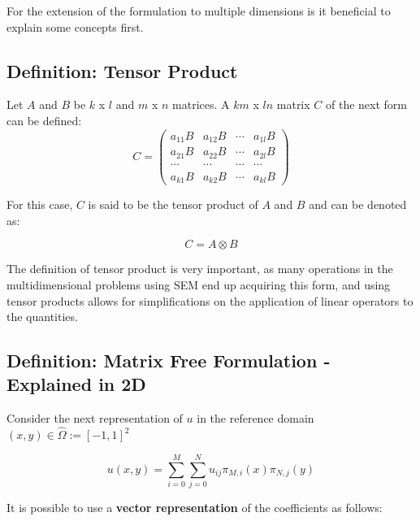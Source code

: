 \documentclass[
  a4paper,
  10pt]{article}
\begin{document}
For the extension of the formulation to multiple dimensions is it
beneficial to explain some concepts first.

\hypertarget{definition-tensor-product}{%
\subsection{Definition: Tensor
Product}\label{definition-tensor-product}}

Let \(A\) and \(B\) be \(k\) x \(l\) and \(m\) x \(n\) matrices. A
\(km\) x \(ln\) matrix \(C\) of the next form can be defined:
\begin{equation}
C=
\begin{pmatrix}
a_{11}B & a_{12}B & \cdots & a_{1l}B\\
a_{21}B & a_{22}B & \cdots & a_{2l}B\\
\cdots & \cdots & \cdots & \cdots\\
a_{k1}B & a_{k2}B & \cdots & a_{kl}B
\end{pmatrix}
\end{equation}

For this case, \(C\) is said to be the tensor product of \(A\) and \(B\)
and can be denoted as:

\begin{equation}
    C=A \otimes B
\end{equation}

The definition of tensor product is very important, as many operations
in the multidimensional problems using SEM end up acquiring this form,
and using tensor products allows for simplifications on the application
of linear operators to the quantities.

\hypertarget{definition-matrix-free-formulation---explained-in-2d}{%
\subsection{Definition: Matrix Free Formulation - Explained in
2D}\label{definition-matrix-free-formulation---explained-in-2d}}

Consider the next representation of \(u\) in the reference
domain\((x,y) \in \hat{\Omega}:=[-1,1]^{2}\)

\begin{equation}
    u(x,y)=\sum_{i=0}^{M}\sum_{j=0}^{N} u_{ij} \pi_{M,i}(x) \pi_{N,j}(y) 
\end{equation}

It is possible to use a \textbf{vector representation} of the
coefficients as follows:
\end{document}
